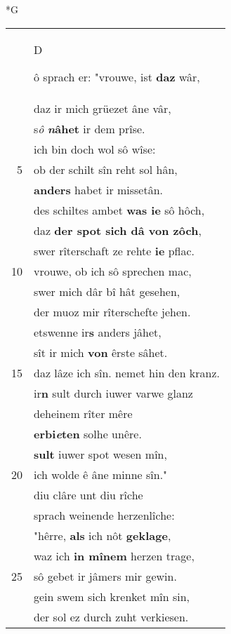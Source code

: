 \documentclass[8pt,a4paper,notitlepage]{article}
\begin{document}
\begin{table}[ht]
\begin{minipage}[t]{0.5\linewidth}
\small
\begin{center}*G
\end{center}
\begin{tabular}{rl}
 & \begin{large}D\end{large}ô sprach er: "vrouwe, ist \textbf{daz} wâr,\\ 
 & daz ir mich grüezet âne vâr,\\ 
 & s\textit{ô} \textbf{\textit{n}âhet} ir dem prîse.\\ 
 & ich bin doch wol sô wîse:\\ 
5 & ob der schilt sîn reht sol hân,\\ 
 & \textbf{anders} habet ir missetân.\\ 
 & des schiltes ambet \textbf{was ie} sô hôch,\\ 
 & daz \textbf{der spot sich dâ von zôch},\\ 
 & swer rîterschaft ze rehte \textbf{ie} pflac.\\ 
10 & vrouwe, ob ich sô sprechen mac,\\ 
 & swer mich dâr bî hât gesehen,\\ 
 & der muoz mir rîterschefte jehen.\\ 
 & etswenne ir\textbf{s} anders jâhet,\\ 
 & sît ir mich \textbf{von} êrste sâhet.\\ 
15 & daz lâze ich sîn. nemet hin den kranz.\\ 
 & ir\textbf{n} sult durch iuwer varwe glanz\\ 
 & deheinem rîter mêre\\ 
 & \textbf{erbi\textit{e}ten} solhe unêre.\\ 
 & \textbf{sult} iuwer spot wesen mîn,\\ 
20 & ich wolde ê âne minne sîn."\\ 
 & diu clâre unt diu rîche\\ 
 & sprach weinende herzenlîche:\\ 
 & "hêrre, \textbf{als} ich nôt \textbf{geklage},\\ 
 & waz ich \textbf{in mînem} herzen trage,\\ 
25 & sô gebet ir jâmers mir gewin.\\ 
 & gein swem sich krenket mîn sin,\\ 
 & der sol ez durch zuht verkiesen.\\ 

\end{tabular}
\end{minipage}
\end{table}
\end{document}
